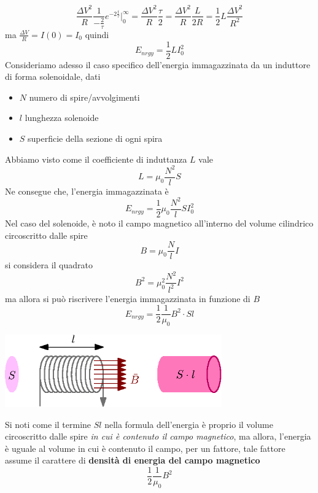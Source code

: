 \documentclass[10pt, letterpaper]{report}
\begin{document}
$$\frac{\Delta V^2}{R}\frac{1}{-\frac{2}{\tau}}e^{-2\frac{t}{\tau}}\Bigg|_0^\infty =\frac{\Delta V^2}{R}\frac{\tau}{2} =\frac{\Delta V^2}{R}\frac{L}{2R}=\frac{1}{2}L\frac{\Delta V^2}{R^2} $$
ma $\frac{\Delta V}{R}=I(0)=I_0$ quindi 
$$E_{nrgy}=\frac{1}{2}LI_0^2 $$
Consideriamo adesso il caso specifico dell'energia immagazzinata da un induttore di forma solenoidale, dati\begin{itemize}
    \item $N$ numero di spire/avvolgimenti 
    \item $l$ lunghezza solenoide 
    \item $S$ superficie della sezione di ogni spira
\end{itemize}
Abbiamo visto come il coefficiente di induttanza $L$ vale 
$$ L=\mu_0\frac{N^2}{l}S$$
Ne consegue che, l'energia immagazzinata è 
$$E_{nrgy}=\frac{1}{2}\mu_0\frac{N^2}{l}SI_0^2 $$
Nel caso del solenoide, è noto il campo magnetico all'interno del volume cilindrico circoscritto dalle spire
$$ B=\mu_0\frac{N}{l}I$$
si considera il quadrato 
$$ B^2=\mu_0^2\frac{N^2}{l^2}I^2$$
ma allora si può riscrivere l'energia immagazzinata in funzione di $B$
$$E_{nrgy}=\frac{1}{2}\frac{1}{\mu_0}B^2\cdot Sl$$\begin{center}
    \includegraphics[width=0.7\textwidth]{images/solenoide3.eps}
\end{center}
Si noti come il termine $Sl$ nella formula dell'energia è proprio il volume circoscritto dalle spire \textit{in cui è contenuto il campo magnetico}, ma allora, l'energia è uguale al volume in cui è contenuto il campo, per un fattore, tale fattore assume il carattere di \textbf{densità di energia del campo magnetico}
$$ \frac{1}{2}\frac{1}{\mu_0}B^2$$
\flowerLine 
\end{document}
